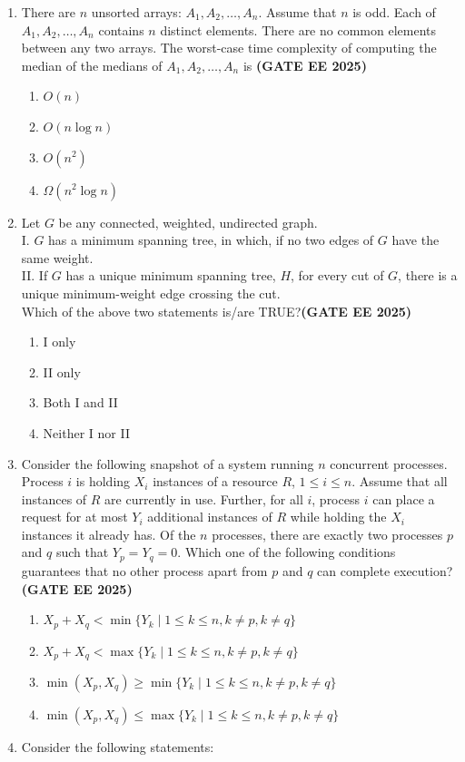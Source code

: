 \documentclass[journal,12pt,onecolumn]{IEEEtran}
\theoremstyle{remark}
\begin{document}
\begin{enumerate}
\item There are $n$ unsorted arrays: $A_1, A_2, \dots, A_n$. Assume that $n$ is odd. Each of $A_1, A_2, \dots, A_n$ contains $n$ distinct elements. There are no common elements between any two arrays. The worst-case time complexity of computing the median of the medians of $A_1, A_2, \dots, A_n$ is \hfill \textbf{(GATE EE 2025)}
\begin{enumerate}
\item  $O(n)$
\item  $O(n \log n)$
\item  $O(n^2)$
\item  $\Omega(n^2 \log n)$
\end{enumerate}

\item Let $G$ be any connected, weighted, undirected graph.\\

I. $G$ has a minimum spanning tree, in which, if no two edges of $G$ have the same weight.\\
II. If $G$ has a unique minimum spanning tree, $H$, for every cut of $G$, there is a unique minimum-weight edge crossing the cut.\\


Which of the above two statements is/are TRUE?\hfill \textbf{(GATE EE 2025)}
\begin{enumerate}
\item  I only
\item  II only
\item  Both I and II
\item  Neither I nor II
\end{enumerate}

\item Consider the following snapshot of a system running $n$ concurrent processes. Process $i$ is holding $X_i$ instances of a resource $R$, $1 \leq i \leq n$. Assume that all instances of $R$ are currently in use. Further, for all $i$, process $i$ can place a request for at most $Y_i$ additional instances of $R$ while holding the $X_i$ instances it already has. Of the $n$ processes, there are exactly two processes $p$ and $q$ such that $Y_p = Y_q = 0$. Which one of the following conditions guarantees that no other process apart from $p$ and $q$ can complete execution? \hfill \textbf{(GATE EE 2025)}

\begin{enumerate}
\item  $X_p + X_q < \min \{Y_k \mid 1 \leq k \leq n, k \neq p, k \neq q\}$
\item  $X_p + X_q < \max \{Y_k \mid 1 \leq k \leq n, k \neq p, k \neq q\}$
\item  $\min(X_p, X_q) \geq \min \{Y_k \mid 1 \leq k \leq n, k \neq p, k \neq q\}$
\item  $\min(X_p, X_q) \leq \max \{Y_k \mid 1 \leq k \leq n, k \neq p, k \neq q\}$
\end{enumerate}
\item Consider the following statements:


\end{enumerate}
\end{document}
